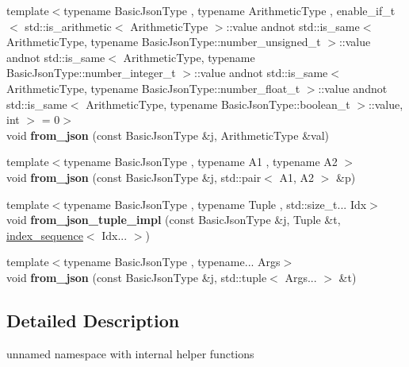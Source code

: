 \begin{DoxyCompactItemize}
\item 
{\footnotesize template$<$typename Basic\+Json\+Type , typename Arithmetic\+Type , enable\+\_\+if\+\_\+t$<$ std\+::is\+\_\+arithmetic$<$ Arithmetic\+Type $>$\+::value andnot std\+::is\+\_\+same$<$ Arithmetic\+Type, typename Basic\+Json\+Type\+::number\+\_\+unsigned\+\_\+t $>$\+::value andnot std\+::is\+\_\+same$<$ Arithmetic\+Type, typename Basic\+Json\+Type\+::number\+\_\+integer\+\_\+t $>$\+::value andnot std\+::is\+\_\+same$<$ Arithmetic\+Type, typename Basic\+Json\+Type\+::number\+\_\+float\+\_\+t $>$\+::value andnot std\+::is\+\_\+same$<$ Arithmetic\+Type, typename Basic\+Json\+Type\+::boolean\+\_\+t $>$\+::value, int $>$  = 0$>$ }\\void {\bfseries from\+\_\+json} (const Basic\+Json\+Type \&j, Arithmetic\+Type \&val)\hypertarget{namespacenlohmann_1_1detail_a839b0ab50d2c9bce669068f56bc41202}{}\label{namespacenlohmann_1_1detail_a839b0ab50d2c9bce669068f56bc41202}

\item 
{\footnotesize template$<$typename Basic\+Json\+Type , typename A1 , typename A2 $>$ }\\void {\bfseries from\+\_\+json} (const Basic\+Json\+Type \&j, std\+::pair$<$ A1, A2 $>$ \&p)\hypertarget{namespacenlohmann_1_1detail_aae9f9c2601074e323d49428132cc293d}{}\label{namespacenlohmann_1_1detail_aae9f9c2601074e323d49428132cc293d}

\item 
{\footnotesize template$<$typename Basic\+Json\+Type , typename Tuple , std\+::size\+\_\+t... Idx$>$ }\\void {\bfseries from\+\_\+json\+\_\+tuple\+\_\+impl} (const Basic\+Json\+Type \&j, Tuple \&t, \hyperlink{structnlohmann_1_1detail_1_1index__sequence}{index\+\_\+sequence}$<$ Idx... $>$)\hypertarget{namespacenlohmann_1_1detail_a28253915d9db4a0112d60eaee0422949}{}\label{namespacenlohmann_1_1detail_a28253915d9db4a0112d60eaee0422949}

\item 
{\footnotesize template$<$typename Basic\+Json\+Type , typename... Args$>$ }\\void {\bfseries from\+\_\+json} (const Basic\+Json\+Type \&j, std\+::tuple$<$ Args... $>$ \&t)\hypertarget{namespacenlohmann_1_1detail_a8b99ec9b29f3f20a18fc4281fb784e49}{}\label{namespacenlohmann_1_1detail_a8b99ec9b29f3f20a18fc4281fb784e49}

\end{DoxyCompactItemize}


\subsection{Detailed Description}
unnamed namespace with internal helper functions 


